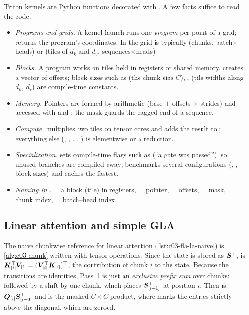 \begin{sloppypar}
\begin{implnote}[title={Reading a Triton kernel}]
Triton \citep{c03-tillet2019triton} kernels are Python functions decorated with
. A few facts suffice to read the \fla{} code.
\begin{itemize}
\item \emph{Programs and grids.} A kernel launch runs one \emph{program} per point of a grid;
 returns the program's coordinates. In \fla{} the grid is typically
(chunks, batch$\times$heads) or (tiles of $d_k$ and $d_v$, sequences$\times$heads).
\item \emph{Blocks.} A program works on tiles held in registers or shared memory.
 creates a vector of offsets; block sizes such as  (the chunk
size $C$), ,  (tile widths along $d_k$, $d_v$) are 
compile-time constants.
\item \emph{Memory.} Pointers are formed by arithmetic (base $+$ offsets $\times$ strides) and
accessed with  and ; the
mask guards the ragged end of a sequence.
\item \emph{Compute.}  multiplies two tiles on tensor cores and adds the
result to ; everything else (\code{*}, , ,
, ) is elementwise or a reduction.
\item \emph{Specialization.}  sets compile-time flags such as
 (``a gate was passed''), so unused branches are compiled away;
 benchmarks several configurations (,
, block sizes) and caches the fastest.
\item \emph{Naming in \fla{}.}  = a block (tile) in registers,  = pointer,
 = offsets,  = mask,  = chunk index,  = batch--head index.
\end{itemize}
\end{implnote}

\subsection{Linear attention and simple GLA}

The naive chunkwise reference for linear attention (\cref{lst:c03-fla-la-naive}) is
\cref{alg:c03-chunk} written with tensor operations. Since the state is stored as $\bm{S}^{\top}$,
 is $\bm{K}_{[i]}^{\top}\bm{V}_{[i]}=(\bm{V}_{[i]}^{\top}\bm{K}_{[i]})^{\top}$, the
contribution of chunk $i$ to the state. Because the transitions are identities, Pass~1 is just an
\emph{exclusive prefix sum} over chunks:  followed by a shift by one chunk, which
places $\bm{S}_{[i-1]}^{\top}$ at position $i$. Then  is $\bm{Q}_{[i]}\bm{S}_{[i-1]}^{\top}$ and
 is the masked $C\times C$ product, where  marks the
entries strictly above the diagonal, which are zeroed.


\end{sloppypar}
